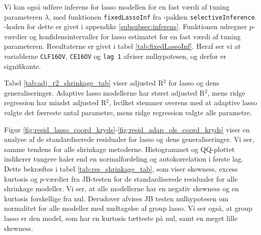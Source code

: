 Vi kan også udføre inferens for lasso modellen for en fast værdi af tuning parameteren \(\lambda\), med funktionen \texttt{fixedLassoInf} fra \Rlang-pakken \texttt{selectiveInference}.
\Rlang-koden for dette er givet i appendiks \ref{subsubsec:inferens}.
Funktionen udregner \(p\)-værdier og konfidensintervaller for lasso estimatet for en fast værdi af tuning parameteren.
Resultaterne er givet i tabel \ref{tab:fixedLassoInf}.
Heraf ser vi at variablerne \texttt{CLF16OV}, \texttt{CE16OV} og \texttt{lag 1} afviser nulhypotesen, og derfor er signifikante.
%

%

\newpage
%
 
%
Tabel \ref{tab:adj_r2_shrinkage_tab} viser adjusted R$^2$ for lasso og dens generaliseringer.
Adaptive lasso modellerne har størst adjusted R$^2$, mens ridge regression har mindst adjusted R\(^2\), hvilket stemmer overens med at adaptive lasso valgte det færreste antal parametre, mens ridge regression valgte alle parametre. 



Figur \ref{fig:resid_lasso_coord_kryds}-\ref{fig:resid_adap_ols_coord_kryds} viser en analyse af de standardiserede residualer for lasso og dens generaliseringer. 
Vi ser, samme tendens for alle shrinkage metoderne. Histogrammet og QQ-plottet indikerer tungere haler end en normalfordeling og autokorrelation i første lag.
Dette bekræftes i tabel \ref{tab:res_shrinkage_tab}, som viser skewness, excess kurtosis og $p$-værdier fra JB-testen for de standardiserede residualer for alle shrinkage modeller. 
Vi ser, at alle modellerne har en negativ skewness og en kurtosis forskellige fra nul. 
Derudover afvises JB testen nulhypotesen om normalitet for alle modeller med undtagelse af group lasso. 
Vi ser også, at group lasso er den model, som har en kurtosis tætteste på nul, samt en meget lille skewness. 

\newpage